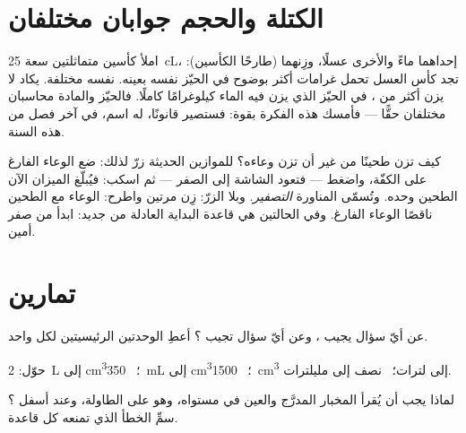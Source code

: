 \section{الكتلة والحجم جوابان مختلفان}

\begin{example}\label{ex:g6:mass-and-volume:different}
املأ كأسين متماثلتين سعة \qty{25}{cL}، إحداهما ماءً والأخرى
عسلًا، وزِنهما (طارحًا الكأسين): تجد كأس العسل تحمل غرامات أكثر
بوضوح في الحيّز نفسه بعينه.  نفسه  مختلفة. 
 يكاد لا يزن أكثر من ، في الحيّز الذي يزن فيه 
الماء كيلوغرامًا كاملًا. فالحيّز والمادة محاسبان مختلفان حقًّا
--- فأمسك هذه الفكرة بقوة: فستصير قانونًا، له اسم، في آخر فصل
من هذه السنة.
\end{example}

\begin{remark}\label{rem:g6:mass-and-volume:tare}
كيف تزن طحينًا من غير أن تزن وعاءه؟ للموازين الحديثة زرّ لذلك:
ضع الوعاء الفارغ على الكفّة، واضغط --- فتعود الشاشة إلى الصفر
--- ثم اسكب: فيُبلّغ الميزان الآن الطحين وحده. وتُسمّى المناورة
\emph{التصفير}. وبلا الزرّ: زِن مرتين واطرح: الوعاء مع الطحين
ناقصًا الوعاء الفارغ. وفي الحالتين هي قاعدة البداية العادلة من
جديد: ابدأ من صفر أمين.
\end{remark}

\section{تمارين}

\begin{exercise}[$\star$]\label{exo:g6:mass-and-volume:1}
عن أيّ سؤال يجيب ، وعن أيّ سؤال تجيب ؟ أعطِ
الوحدتين الرئيسيتين لكل واحد.
\end{exercise}

\begin{exercise}[$\star$]\label{exo:g6:mass-and-volume:2}
حوّل: \qty{2}{L} إلى \unit{cm^3}؛ \ \qty{350}{mL} إلى
\unit{cm^3}؛ \ \qty{1500}{cm^3} إلى لترات؛ \ نصف  إلى
مليلترات.
\end{exercise}

\begin{exercise}[$\star$]\label{exo:g6:mass-and-volume:3}
لماذا يجب أن يُقرأ المخبار المدرَّج والعين في مستواه، وهو على
الطاولة، وعند أسفل ؟ سمِّ الخطأ الذي تمنعه كل
قاعدة.
\end{exercise}

